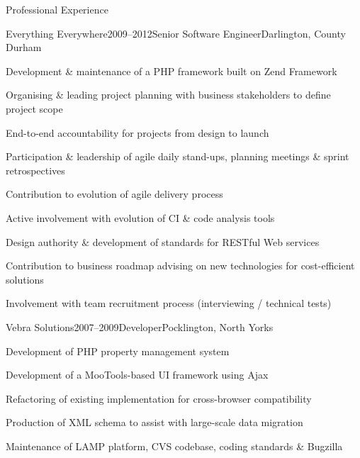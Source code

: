 \documentclass{cv}
\begin{document}
\begin{rSection}{Professional Experience}


\begin{rSubsection}{Everything Everywhere}{2009--2012}{Senior Software Engineer}{Darlington, County Durham}
\item Development \& maintenance of a PHP framework built on Zend Framework
\item Organising \& leading project planning with business stakeholders to define project scope
\item End-to-end accountability for projects from design to launch
\item Participation \& leadership of agile daily stand-ups, planning meetings \& sprint retrospectives
\item Contribution to evolution of agile delivery process
\item Active involvement with evolution of CI \& code analysis tools
\item Design authority \& development of standards for RESTful Web services
\item Contribution to business roadmap advising on new technologies for cost-efficient solutions
\item Involvement with team recruitment process (interviewing / technical tests)
\end{rSubsection}


\begin{rSubsection}{Vebra Solutions}{2007--2009}{Developer}{Pocklington, North Yorks}
\item Development of PHP property management system
\item Development of a MooTools-based UI framework using Ajax
\item Refactoring of existing implementation for cross-browser compatibility
\item Production of XML schema to assist with large-scale data migration
\item Maintenance of LAMP platform, CVS codebase, coding standards \& Bugzilla
\end{rSubsection}

\end{rSection}

\end{document}
